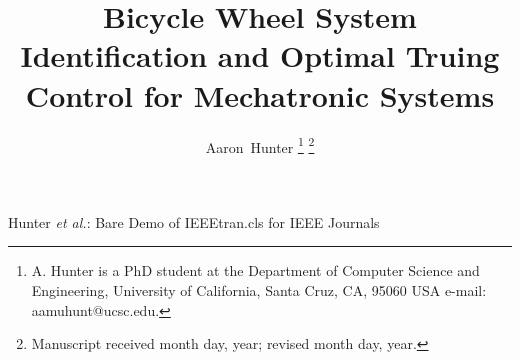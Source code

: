 \documentclass[journal]{IEEEtran}
\begin{document}
%
\title{Bicycle Wheel System Identification and Optimal Truing Control for Mechatronic Systems}
%
%
%

\author{Aaron~Hunter%
\thanks{A. Hunter is a PhD student at the Department of Computer Science and Engineering, University of California, Santa Cruz, CA, 95060 USA e-mail: aamuhunt@ucsc.edu.}%
\thanks{Manuscript received month day, year; revised month day, year.}}

% 
%



%
{Hunter \MakeLowercase{\textit{et al.}}: Bare Demo of IEEEtran.cls for IEEE Journals}
% 
\end{document}
